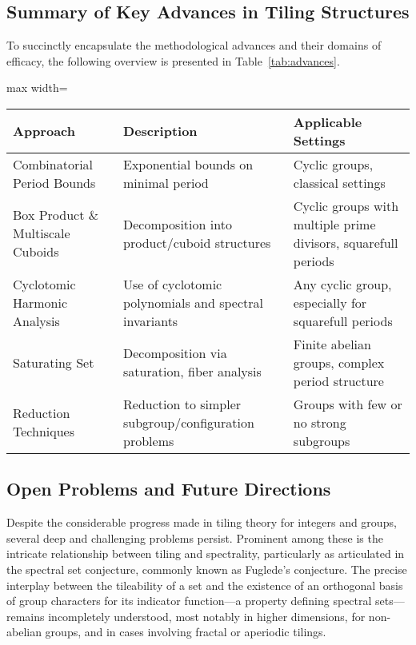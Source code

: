 \documentclass[sigconf]{acmart}
\begin{document}
\subsection{Summary of Key Advances in Tiling Structures}

To succinctly encapsulate the methodological advances and their domains of efficacy, the following overview is presented in Table~\ref{tab:advances}.

\begin{table*}[htbp]
\centering
\caption{Major Approaches in Tiling Theory and Their Domains of Applicability}
\label{tab:advances}
\begin{adjustbox}{max width=\textwidth}
\begin{tabular}{lll}
\toprule
\textbf{Approach} & \textbf{Description} & \textbf{Applicable Settings} \\
\midrule
Combinatorial Period Bounds & Exponential bounds on minimal period & Cyclic groups, classical settings \\
Box Product \& Multiscale Cuboids & Decomposition into product/cuboid structures & Cyclic groups with multiple prime divisors, squarefull periods \\
Cyclotomic Harmonic Analysis & Use of cyclotomic polynomials and spectral invariants & Any cyclic group, especially for squarefull periods \\
Saturating Set & Decomposition via saturation, fiber analysis & Finite abelian groups, complex period structure \\
Reduction Techniques & Reduction to simpler subgroup/configuration problems & Groups with few or no strong subgroups \\
\bottomrule
\end{tabular}
\end{adjustbox}
\end{table*}

\subsection{Open Problems and Future Directions}

Despite the considerable progress made in tiling theory for integers and groups, several deep and challenging problems persist. Prominent among these is the intricate relationship between tiling and spectrality, particularly as articulated in the spectral set conjecture, commonly known as Fuglede’s conjecture. The precise interplay between the tileability of a set and the existence of an orthogonal basis of group characters for its indicator function—a property defining spectral sets—remains incompletely understood, most notably in higher dimensions, for non-abelian groups, and in cases involving fractal or aperiodic tilings.
\end{document}
